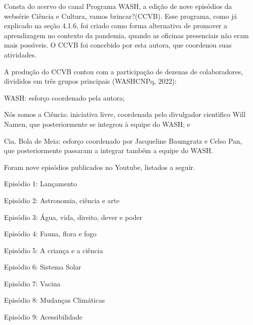 \documentclass[
12pt,		%
openright,	%
twoside,  %
a4paper,			%
chapter=TITLE,		%
english,			%
french,				%
spanish,			%
brazil				%
]{USPSC-classe/USPSC}
\begin{document}
Consta do acervo do canal \textquotedbl Programa WASH\textquotedbl , a edi\c{c}\~ao de nove epis\'odios da webs\'erie \textquotedbl Ci\^encia e Cultura, vamos brincar?\textquotedbl  (CCVB). Esse programa, como j\'a explicado na se\c{c}\~ao 4.1.6, foi criado como forma alternativa de promover a aprendizagem no contexto da pandemia, quando as oficinas presenciais n\~ao eram mais poss\'{\i}veis. O CCVB foi concebido por esta autora, que coordenou suas atividades.

















A produ\c{c}\~ao do CCVB contou com a participa\c{c}\~ao de dezenas de colaboradores, divididos em tr\^es grupos principais  (WASHCNPq, 2022):


















\begin{alineas}
\item WASH: esfor\c{c}o coordenado pela autora;
\item \textquotedbl N\'os somos a Ci\^encia\textquotedbl : iniciativa livre, coordenada pelo divulgador cient\'{\i}fico Will Namen, que posteriormente se integrou \`a equipe do WASH; e
\item Cia. Bola de Meia: esfor\c{c}o coordenado por Jacqueline Baumgratz e Celso Pan, que posteriormente passaram  a integrar tamb\'em a equipe do WASH.
\end{alineas}

Foram nove epis\'odios publicados no Youtube, listados a seguir.


















\begin{alineas}
\item Epis\'odio 1: Lan\c{c}amento
\item Epis\'odio 2: Astronomia, ci\^encia e arte
\item Epis\'odio 3: \'Agua, vida, direito, dever e poder
\item Epis\'odio 4: Fauna, flora e fogo
\item Epis\'odio 5: A crian\c{c}a e a ci\^encia
\item Epis\'odio 6: Sistema Solar
\item Epis\'odio 7: Vacina
\item Epis\'odio 8: Mudan\c{c}as Clim\'aticas
\item Epis\'odio 9: Acessibilidade
\end{alineas}
\end{document}
